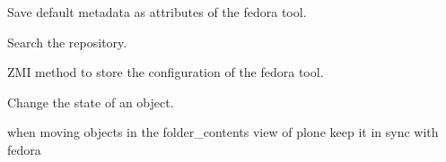 \documentclass[a4paper,10pt,ngerman]{sphinxmanual}
\begin{document}
\begin{fulllineitems}
\begin{fulllineitems}
\end{fulllineitems}


\begin{fulllineitems}
\label{tools:Products.DiPP.Fedora2DiPP3Tool.Fedora.manage_save_metadata}
Save default metadata as attributes of the fedora tool.

\end{fulllineitems}


\begin{fulllineitems}
\label{tools:Products.DiPP.Fedora2DiPP3Tool.Fedora.manage_search}
Search the repository.

\end{fulllineitems}


\begin{fulllineitems}
\label{tools:Products.DiPP.Fedora2DiPP3Tool.Fedora.manage_setFedoraSettings}
ZMI method to store the configuration of the fedora tool.

\end{fulllineitems}


\begin{fulllineitems}
\label{tools:Products.DiPP.Fedora2DiPP3Tool.Fedora.modifyObject}
Change the state of an object.

\end{fulllineitems}


\begin{fulllineitems}
\label{tools:Products.DiPP.Fedora2DiPP3Tool.Fedora.moveObjects}
when moving objects in the folder\_contents view of plone
keep it in sync with fedora


\end{fulllineitems}
\end{fulllineitems}
\end{document}
